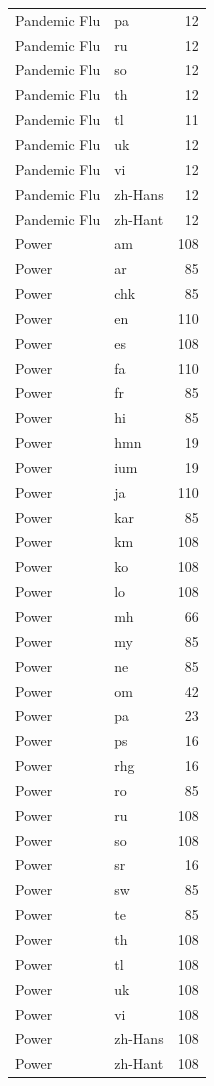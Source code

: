 \begin{longtable}{p{3cm} p{3cm} r}
Pandemic Flu & pa & 12 \\
Pandemic Flu & ru & 12 \\
Pandemic Flu & so & 12 \\
Pandemic Flu & th & 12 \\
Pandemic Flu & tl & 11 \\
Pandemic Flu & uk & 12 \\
Pandemic Flu & vi & 12 \\
Pandemic Flu & zh-Hans & 12 \\
Pandemic Flu & zh-Hant & 12 \\
Power & am & 108 \\
Power & ar & 85 \\
Power & chk & 85 \\
Power & en & 110 \\
Power & es & 108 \\
Power & fa & 110 \\
Power & fr & 85 \\
Power & hi & 85 \\
Power & hmn & 19 \\
Power & ium & 19 \\
Power & ja & 110 \\
Power & kar & 85 \\
Power & km & 108 \\
Power & ko & 108 \\
Power & lo & 108 \\
Power & mh & 66 \\
Power & my & 85 \\
Power & ne & 85 \\
Power & om & 42 \\
Power & pa & 23 \\
Power & ps & 16 \\
Power & rhg & 16 \\
Power & ro & 85 \\
Power & ru & 108 \\
Power & so & 108 \\
Power & sr & 16 \\
Power & sw & 85 \\
Power & te & 85 \\
Power & th & 108 \\
Power & tl & 108 \\
Power & uk & 108 \\
Power & vi & 108 \\
Power & zh-Hans & 108 \\
Power & zh-Hant & 108 \\

\end{longtable}
